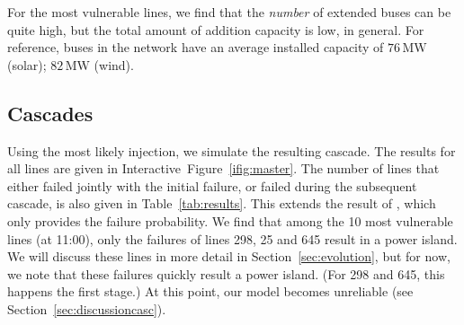 \documentclass[main.tex]{subfiles}
\begin{document}
For the most vulnerable lines, we find that the \emph{number} of extended buses can be quite high, but the total amount of addition capacity is low, in general. For reference, buses in the network have an average installed capacity of $76\,\si{\mega\watt}$ (solar); $82\,\si{\mega\watt}$ (wind). 



\subsection{Cascades}
Using the most likely injection, we simulate the resulting cascade. The results for all lines are given in Interactive~Figure~\ref{ifig:master}. The number of lines that either failed jointly with the initial failure, or failed during the subsequent cascade, is also given in Table~\ref{tab:results}. This extends the result of \cite{Nesti2018supplemental}, which only provides the failure probability. We find that among the 10 most vulnerable lines (at 11:00),
only the failures of lines 298, 25 and 645 result in a power island. We will discuss these lines in more detail in Section~\ref{sec:evolution}, but for now, we note that these failures quickly result a power island. (For 298 and 645, this happens the first stage.) At this point, our model becomes unreliable (see Section~\ref{sec:discussioncasc}).
\end{document}
